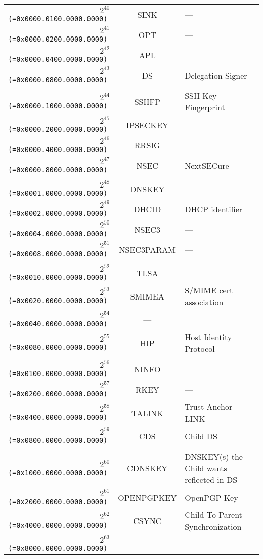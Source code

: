 \documentclass[documentation]{subfiles}
\begin{document}
\begin{longtable}{>{\tt}rcl}
    \\
    $2^{40}$ (=0x0000.0100.0000.0000) & SINK        & --- \\
    $2^{41}$ (=0x0000.0200.0000.0000) & OPT         & --- \\
    $2^{42}$ (=0x0000.0400.0000.0000) & APL         & --- \\
    $2^{43}$ (=0x0000.0800.0000.0000) & DS          & Delegation Signer \\
    \\
    $2^{44}$ (=0x0000.1000.0000.0000) & SSHFP       & SSH Key Fingerprint \\
    $2^{45}$ (=0x0000.2000.0000.0000) & IPSECKEY    & --- \\
    $2^{46}$ (=0x0000.4000.0000.0000) & RRSIG       & --- \\
    $2^{47}$ (=0x0000.8000.0000.0000) & NSEC        & NextSECure \\
    \\
    $2^{48}$ (=0x0001.0000.0000.0000) & DNSKEY      & --- \\
    $2^{49}$ (=0x0002.0000.0000.0000) & DHCID       & DHCP identifier \\
    $2^{50}$ (=0x0004.0000.0000.0000) & NSEC3       & --- \\
    $2^{51}$ (=0x0008.0000.0000.0000) & NSEC3PARAM  & --- \\
    \\
    $2^{52}$ (=0x0010.0000.0000.0000) & TLSA        & --- \\
    $2^{53}$ (=0x0020.0000.0000.0000) & SMIMEA      & S/MIME cert association \\
    $2^{54}$ (=0x0040.0000.0000.0000) & ---         & \\
    $2^{55}$ (=0x0080.0000.0000.0000) & HIP         & Host Identity Protocol \\
    \\
    $2^{56}$ (=0x0100.0000.0000.0000) & NINFO       & --- \\
    $2^{57}$ (=0x0200.0000.0000.0000) & RKEY        & --- \\
    $2^{58}$ (=0x0400.0000.0000.0000) & TALINK      & Trust Anchor LINK \\
    $2^{59}$ (=0x0800.0000.0000.0000) & CDS         & Child DS \\
    \\
    $2^{60}$ (=0x1000.0000.0000.0000) & CDNSKEY     & DNSKEY(s) the Child wants reflected in DS \\
    $2^{61}$ (=0x2000.0000.0000.0000) & OPENPGPKEY  & OpenPGP Key \\
    $2^{62}$ (=0x4000.0000.0000.0000) & CSYNC       & Child-To-Parent Synchronization \\
    $2^{63}$ (=0x8000.0000.0000.0000) & ---         & \\
    \bottomrule
\end{longtable}
\end{document}
